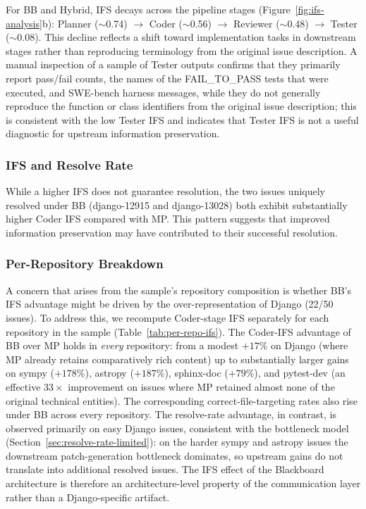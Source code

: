 \documentclass{ieeeaccess}
\begin{document}
For BB and Hybrid, IFS decays across the pipeline stages (Figure~\ref{fig:ifs-analysis}b): Planner ($\sim$0.74) $\rightarrow$ Coder ($\sim$0.56) $\rightarrow$ Reviewer ($\sim$0.48) $\rightarrow$ Tester ($\sim$0.08). This decline reflects a shift toward implementation tasks in downstream stages rather than reproducing terminology from the original issue description. A manual inspection of a sample of Tester outputs confirms that they primarily report pass/fail counts, the names of the FAIL\_TO\_PASS tests that were executed, and SWE-bench harness messages, while they do not generally reproduce the function or class identifiers from the original issue description; this is consistent with the low Tester IFS and indicates that Tester IFS is not a useful diagnostic for upstream information preservation.

\subsubsection{IFS and Resolve Rate}

While a higher IFS does not guarantee resolution, the two issues uniquely resolved under BB (django-12915 and django-13028) both exhibit substantially higher Coder IFS compared with MP. This pattern suggests that improved information preservation may have contributed to their successful resolution.

\subsubsection{Per-Repository Breakdown}
\label{sec:per-repo-ifs}

A concern that arises from the sample's repository composition is whether BB's IFS advantage might be driven by the over-representation of Django (22/50 issues). To address this, we recompute Coder-stage IFS separately for each repository in the sample (Table~\ref{tab:per-repo-ifs}). The Coder-IFS advantage of BB over MP holds in \emph{every} repository: from a modest $+17$\% on Django (where MP already retains comparatively rich content) up to substantially larger gains on sympy ($+178$\%), astropy ($+187$\%), sphinx-doc ($+79$\%), and pytest-dev (an effective $33\times$ improvement on issues where MP retained almost none of the original technical entities). The corresponding correct-file-targeting rates also rise under BB across every repository. The resolve-rate advantage, in contrast, is observed primarily on easy Django issues, consistent with the bottleneck model (Section~\ref{sec:resolve-rate-limited}): on the harder sympy and astropy issues the downstream patch-generation bottleneck dominates, so upstream gains do not translate into additional resolved issues. The IFS effect of the Blackboard architecture is therefore an architecture-level property of the communication layer rather than a Django-specific artifact.
\end{document}
